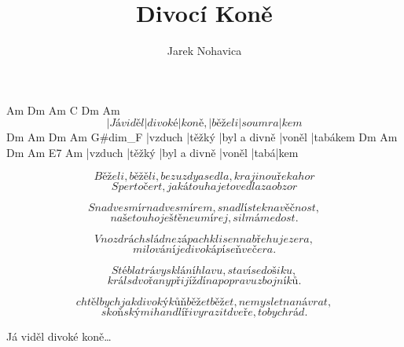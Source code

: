 \documentclass{song}
\title{Divocí Koně}
\author{Jarek Nohavica}
\begin{document}
\strophe
   Am        Dm      Am     C       Dm     Am
\[ |Já viděl |divoké |koně, |běželi |soumra|kem \]
Dm      Am     Dm           Am     G#dim_F
|vzduch |těžký |byl a divně |voněl |tabákem
Dm      Am     Dm           Am     E7   Am
|vzduch |těžký |byl a divně |voněl |tabá|kem
\endstrophe

\strophe*
\[ Běželi, běžěli, bez uzdy a sedla,krajinou řek a hor \]
\[ Sper to čert, jaká touha je to vedla za obzor \]
\endstrophe

\strophe*
\[ Snad vesmír nad vesmírem, snad lístek na věčnost, \]
\[ naše touho ještě neumírej, sil máme dost. \]
\endstrophe

\strophe*
\[ V nozdrách sládne zápach klisen na břehu jezera, \]
\[ milování je divoká píseň večera. \]
\endstrophe

\strophe*
\[ Stébla trávy sklání hlavu , staví se do šiku, \]
\[ král s dvořany přijíždí na popravu zbojníků. \]
\endstrophe

\strophe*
\[ chtěl bych jak divoký kůň běžet běžet, nemyslet na návrat, \]
\[ s koňskými handlíři vyrazit dveře, to bych rád. \]
\endstrophe

Já viděl divoké koně\ldots
\end{document}
